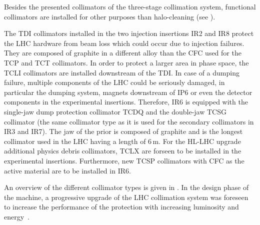 Besides the presented collimators of the three-stage collimation system, functional collimators are installed for other purposes than halo-cleaning (see ). 

The TDI collimators installed in the two injection insertions IR2 and IR8 protect the LHC hardware from beam loss which could occur due to injection failures. They are composed of graphite in a different alloy than the CFC used for the TCP and TCT collimators. In order to protect a larger area in phase space, the TCLI collimators are installed downstream of the TDI. In case of a dumping failure, multiple components of the LHC could be seriously damaged, in particular the dumping system, magnets downstream of IP6 or even the detector components in the experimental insertions. Therefore, IR6 is equipped with the single-jaw dump protection collimator TCDQ and the double-jaw TCSG collimator (the same collimator type as it is used for the secondary collimators in IR3 and IR7). The jaw of the prior is composed of graphite and is the longest collimator used in the LHC having a length of 6$\,$m. 
For the HL-LHC upgrade additional physics debris collimators, TCLX are forseen to be installed in the experimental insertions. Furthermore, new TCSP collimators with CFC as the active material are to be installed in IR6.


An overview of the different collimator types is given in . In the design phase of the machine, a progressive upgrade of the LHC collimation system was foreseen to increase the performance of the protection with increasing luminosity and energy~\citedr. 


\newpage
